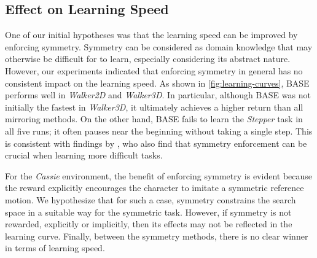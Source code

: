 \subsection{Effect on Learning Speed}

One of our initial hypotheses was that the learning speed can be improved by enforcing symmetry.  
Symmetry can be considered as domain knowledge that may otherwise be difficult for to learn, 
especially considering its abstract nature.  
However, our experiments indicated that enforcing symmetry in general has no consistent impact on the learning speed.
As shown in \autoref{fig:learning-curves}, BASE performs well in \textit{Walker2D} and \textit{Walker3D}.  
In particular, although BASE was not initially the fastest in \textit{Walker3D}, 
it ultimately achieves a higher return than all mirroring methods.  
On the other hand, BASE fails to learn the \textit{Stepper} task in all five runs;
it often pauses near the beginning without taking a single step.  
This is consistent with findings by \citeauthor{Yu-SIGGRAPH-2018}, 
who also find that symmetry enforcement can be crucial when learning more difficult tasks.

For the \textit{Cassie} environment, the benefit of enforcing symmetry is evident 
because the reward explicitly encourages the character to imitate a symmetric reference motion.  
We hypothesize that for such a case, symmetry constrains the search space in a suitable way 
for the symmetric task. However, if symmetry is not rewarded, explicitly or implicitly, 
then its effects may not be reflected in the learning curve.  Finally, between the symmetry methods, 
there is no clear winner in terms of learning speed.

